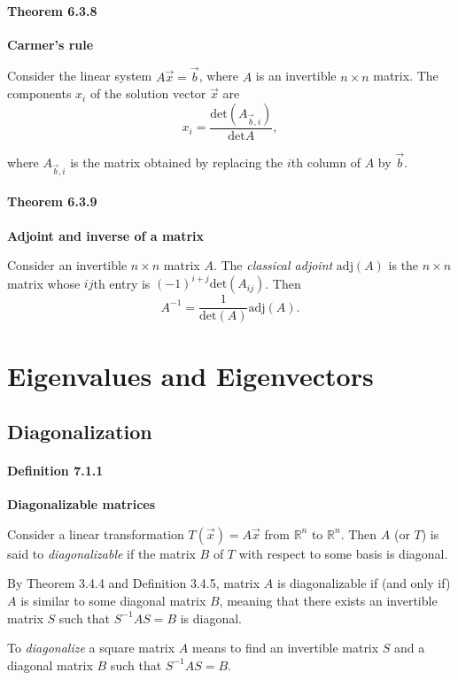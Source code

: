 \documentclass{report}
\begin{document}
\subsubsection*{Theorem 6.3.8}
\par\noindent\textbf{Carmer's rule}
\par\noindent Consider the linear system $A\vec{x}=\vec{b}$, where $A$ is an invertible $n\times{}n$ matrix. The components $x_{i}$ of the solution vector $\vec{x}$ are
\[x_{i}=\frac{\textrm{det}(A_{\vec{b},i})}{\textrm{det}A},\]
\par\noindent where $A_{\vec{b},i}$ is the matrix obtained by replacing the $i$th column of $A$ by $\vec{b}$.
\subsubsection*{Theorem 6.3.9}
\par\noindent\textbf{Adjoint and inverse of a matrix}
\par\noindent Consider an invertible $n\times{}n$ matrix $A$. The \textit{classical adjoint} $\textrm{adj}(A)$ is the $n\times{}n$ matrix whose $ij$th entry is $(-1)^{i+j}\textrm{det}(A_{ij})$. Then
\[A^{-1}=\frac{1}{\textrm{det}(A)}\textrm{adj}(A).\]

\chapter{Eigenvalues and Eigenvectors}

\section{Diagonalization}
\subsubsection*{Definition 7.1.1}
\par\noindent\textbf{Diagonalizable matrices}
\par\noindent Consider a linear transformation $T(\vec{x})=A\vec{x}$ from $\mathbb{R}^{n}$ to $\mathbb{R}^{n}$. Then $A$ (or $T$) is said to \textit{diagonalizable} if the matrix $B$ of $T$ with respect to some basis is diagonal.
\par By Theorem 3.4.4 and Definition 3.4.5, matrix $A$ is diagonalizable if (and only if) $A$ is similar to some diagonal matrix $B$, meaning that there exists an invertible matrix $S$ such that $S^{-1}AS=B$ is diagonal.
\par To \textit{diagonalize} a square matrix $A$ means to find an invertible matrix $S$ and a diagonal matrix $B$ such that $S^{-1}AS=B$.
\end{document}
